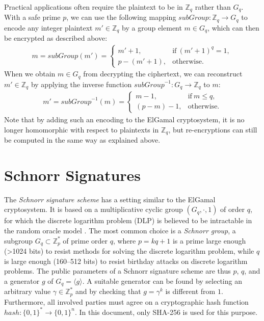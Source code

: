 \documentclass[bibtotoc,halfparskip,oneside]{scrreprt}
\begin{document}
Practical applications often require the plaintext to be in $\mathbb{Z}_q$ rather than $G_q$. With a safe prime $p$, we can use the following mapping $\mathit{subGroup}:\mathbb{Z}_q\rightarrow G_q$ to encode any integer plaintext $m'\in\mathbb{Z}_q$ by a group element $m\in G_q$, which can then be encrypted as described above:
\begin{align}
	m=\mathit{subGroup}(m')=
	\begin{cases}
		m'+1,&  \text{if}~ (m'+1)^q=1,\\
		p-(m'+1),&  \text{otherwise}.
	\end{cases}
\end{align}
When we obtain $m\in G_q$ from decrypting the ciphertext, we can reconstruct $m'\in\mathbb{Z}_q$ by applying the inverse function $\mathit{subGroup}^{-1}:G_q \rightarrow \mathbb{Z}_q$ to $m$:
\begin{align}
	m'=\mathit{subGroup}^{-1}(m)=
	\begin{cases}
		m-1,&  \text{if}~ m \leq q,\\
		(p-m)-1,&  \text{otherwise}.
	\end{cases}
\end{align}
Note that by adding such an encoding to the ElGamal cryptosystem, it is no longer homomorphic with respect to plaintexts in $\mathbb{Z}_q$, but re-encryptions can still be computed in the same way as explained above.

\section{Schnorr Signatures}\label{schnorrsig}

The \emph{Schnorr signature scheme} has a setting similar to the ElGamal cryptosystem. It is based on a multiplicative cyclic group $(G_q,\cdot,1)$ of order $q$, for which the discrete logarithm problem (DLP) is believed to be intractable in the random oracle model \cite{schnorr91}. The most common choice is a \emph{Schnorr group}, a subgroup $G_q\subset\mathbb{Z}_p^*$ of prime order $q$, where $p=kq+1$ is a  prime large enough (>1024 bits) to resist methods for solving the discrete logarithm problem, while $q$ is large enough (160--512 bits) to resist birthday attacks on discrete logarithm problems. The public parameters of a Schnorr signature scheme are thus $p$, $q$, and a generator $g$ of $G_q=\langle g\rangle$. A suitable generator can be found by selecting an arbitrary value $\gamma\in\mathbb{Z}_p^*$ and by checking that $g=\gamma^k$ is different from $1$. Furthermore, all involved parties must agree on a cryptographic hash function $\mathit{hash}:\{0,1\}^*\rightarrow \{0,1\}^n$. In this document, only SHA-256 is used for this purpose.
\end{document}
